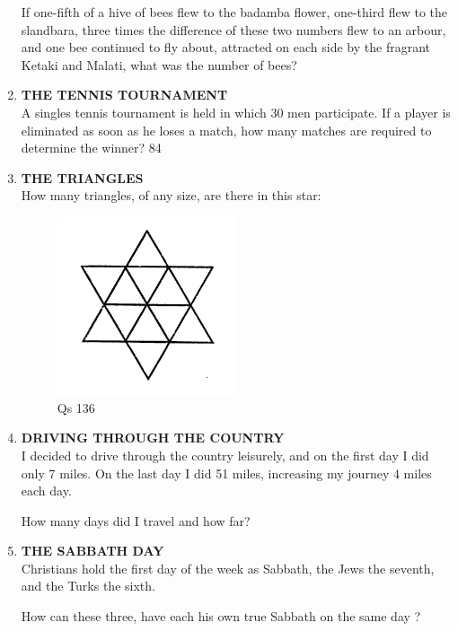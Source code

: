 \documentclass[12pt]{article}
\begin{document}
\begin{enumerate}
If one-fifth  of a hive  of bees  flew  to the  badamba flower,  one-third  flew  to the  slandbara,  three  times  the difference  of these  two numbers  flew  to an arbour,  and one bee continued  to fly about,  attracted  on each  side  by the fragrant  Ketaki  and Malati,  what  was  the number  of bees? 
%
%
\item \textbf{THE  TENNIS  TOURNAMENT} \\
A singles  tennis  tournament  is held  in which  30 men participate.  If a player  is eliminated  as soon  as he loses a match,  how  many  matches  are  required  to determine the winner? 
84 
%
%
\item \textbf{THE  TRIANGLES} \\ 
How  many  triangles,  of any size,  are there  in this star: 
\begin{figure}[h]
\begin{center}
\includegraphics[width=0.5\textwidth]{images/sdevi_q136.png}
\caption{ Qs 136}
\end{center}
\end{figure}


\item \textbf{DRIVING  THROUGH  THE  COUNTRY} \\ 
I decided  to drive  through  the  country  leisurely,  and on the first  day I did only  7 miles.  On  the last day I did 51 miles,  increasing  my journey  4 miles  each  day. 

How  many  days  did I travel  and how  far? 


\item \textbf{THE  SABBATH  DAY} \\
Christians  hold  the first  day  of the  week  as Sabbath, the Jews  the seventh,  and the Turks  the sixth. 

How  can these  three,  have  each  his own  true  Sabbath on the same  day ? 



\end{enumerate}
\end{document}
